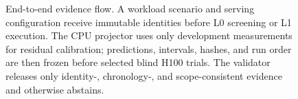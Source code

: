 \begin{figure}[t]
{%
}
\caption{End-to-end \system{} evidence flow.  A workload scenario and serving
configuration receive immutable identities before L0 screening or L1 execution.
The CPU projector uses only development measurements for residual calibration;
predictions, intervals, hashes, and run order are then frozen before selected
blind H100 trials.  The validator releases only identity-, chronology-, and
scope-consistent evidence and otherwise abstains.}
\label{fig:sandbox-ladder}
\end{figure}
